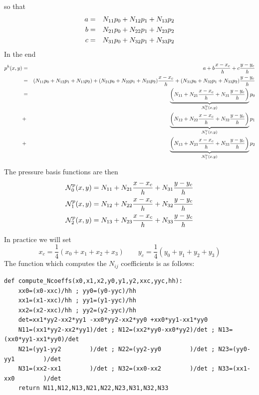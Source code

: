 so that
\begin{eqnarray}
a &=& N_{11}p_0 + N_{12} p_1 + N_{13} p_2 \nonumber\\
b &=& N_{21}p_0 + N_{22} p_1 + N_{23} p_2 \nonumber\\
c &=& N_{31}p_0 + N_{32} p_1 + N_{33} p_2 \nonumber
\end{eqnarray}
In the end
\begin{eqnarray}
p^h(x,y) %
&=& a+b\frac{x-x_c}{h}+c \frac{y-y_c}{h} \nn\\
&=& (N_{11}p_0 + N_{12} p_1 + N_{13} p_2)
+ ( N_{21}p_0 + N_{22} p_1 + N_{23} p_2) \frac{x-x_c}{h}
+ ( N_{31}p_0 + N_{32} p_1 + N_{33} p_2) \frac{y-y_c}{h} \nn\\
&=&\underbrace{\left(N_{11} + N_{21} \frac{x-x_c}{h} + N_{31}\frac{y-y_c}{h}\right)}_{\bN_0^p(x,y)} p_0 \nn\\
&+&  \underbrace{\left(N_{12} + N_{22} \frac{x-x_c}{h} + N_{32}\frac{y-y_c}{h}\right)}_{\bN_1^p(x,y)} p_1 \nn\\
&+&  \underbrace{\left(N_{13} + N_{23} \frac{x-x_c}{h} + N_{33}\frac{y-y_c}{h}\right)}_{\bN_1^p(x,y)} p_2
\label{f76_NNNP}
\end{eqnarray}

The pressure basis functions are then 
\begin{align}
{\mathcal{N}}_0^p(x,y) &= N_{11} + N_{21}\frac{x-x_c}{h}  + N_{31}\frac{y-y_c}{h} \nonumber\\
{\mathcal{N}}_1^p(x,y) &= N_{12} + N_{22}\frac{x-x_c}{h}  + N_{32}\frac{y-y_c}{h} \nonumber\\
{\mathcal{N}}_2^p(x,y) &= N_{13} + N_{23}\frac{x-x_c}{h}  + N_{33}\frac{y-y_c}{h} \nonumber
\end{align}

In practice we will set 
\[
x_c=\frac14(x_0+x_1+x_2+x_3)
\qquad
y_c=\frac14(y_0+y_1+y_2+y_3)
\]
The function which computes the $N_{ij}$ coefficients is as follows:
\begin{lstlisting}
def compute_Ncoeffs(x0,x1,x2,y0,y1,y2,xxc,yyc,hh):
    xx0=(x0-xxc)/hh ; yy0=(y0-yyc)/hh
    xx1=(x1-xxc)/hh ; yy1=(y1-yyc)/hh
    xx2=(x2-xxc)/hh ; yy2=(y2-yyc)/hh
    det=xx1*yy2-xx2*yy1 -xx0*yy2-xx2*yy0 +xx0*yy1-xx1*yy0
    N11=(xx1*yy2-xx2*yy1)/det ; N12=(xx2*yy0-xx0*yy2)/det ; N13=(xx0*yy1-xx1*yy0)/det
    N21=(yy1-yy2        )/det ; N22=(yy2-yy0        )/det ; N23=(yy0-yy1        )/det
    N31=(xx2-xx1        )/det ; N32=(xx0-xx2        )/det ; N33=(xx1-xx0        )/det
    return N11,N12,N13,N21,N22,N23,N31,N32,N33 
\end{lstlisting}



